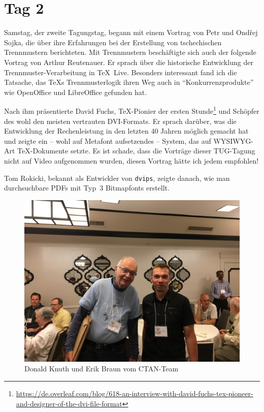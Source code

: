 \documentclass[ngerman]{dtk}
\begin{document}
\section{Tag 2}

Samstag, der zweite Tagungstag, begann mit einem Vortrag von Petr  und Ondřej Sojka, die über ihre Erfahrungen bei der Erstellung von tschechischen Trennmustern berichteten. Mit Trennmustern beschäftigte sich auch der folgende Vortrag von Arthur Reutenauer. Er sprach über die historische Entwicklung der Trennmuster-Verarbeitung in \TeX\ Live. Besonders interessant fand ich die Tatsache, das \TeX s Trennmusterlogik ihren Weg auch in \enquote{Konkurrenzprodukte} wie OpenOffice und LibreOffice gefunden hat.

Nach ihm präsentierte David Fuchs, \TeX-Pionier der ersten Stunde\footnote{\url{https://de.overleaf.com/blog/618-an-interview-with-david-fuchs-tex-pioneer-and-designer-of-the-dvi-file-format}} und Schöpfer des wohl den meisten vertrauten DVI-Formats. Er sprach darüber, was die Entwicklung der Rechenleistung in den letzten 40 Jahren möglich gemacht hat und zeigte ein -- wohl auf Metafont aufsetzendes -- System, das auf WYSIWYG-Art \TeX-Dokumente setzte. Es ist schade, dass die Vorträge dieser TUG-Tagung nicht auf Video aufgenommen wurden, diesen Vortrag hätte ich jedem empfohlen!

Tom Rokicki, bekannt als Entwickler von \texttt{dvips}, zeigte danach, wie man durchsuchbare PDFs mit Typ~3 Bitmapfonts erstellt. 

\begin{figure}[t]
\includegraphics[width=\textwidth]{Don_Erik}
\caption{Donald Knuth und Erik Braun vom CTAN-Team}
\end{figure}
\end{document}
